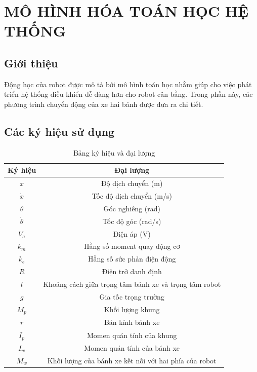 \chapter{MÔ HÌNH HÓA TOÁN HỌC HỆ THỐNG}
    \section{Giới thiệu}
        \hspace*{0.6cm}Động học của robot được mô tả bởi mô hình toán học nhằm giúp cho việc phát triển hệ thống điều khiển dễ dàng hơn cho robot cân bằng. Trong phần này, các phương trình chuyển động của xe hai bánh được đưa ra chi tiết.
    \section{Các ký hiệu sử dụng}
        \begin{table}[H]
            \centering
            \begin{tabular}{|c|c|}
                \hline
                \textbf{Ký hiệu} & \textbf{Đại lượng} \\ \hline
                $x$ & Độ dịch chuyển (m) \\ \hline
                $\dot{x}$ & Tốc độ dịch chuyển (m/s) \\ \hline
                $\theta$ & Góc nghiêng (rad) \\ \hline
                $\dot{\theta}$ & Tốc độ góc (rad/s) \\ \hline
                $V_a$ & Điện áp (V) \\ \hline
                $k_m$ & Hằng số moment quay động cơ \\ \hline
                $k_e$ & Hằng số sức phản điện động \\ \hline
                $R$ & Điện trở danh định \\ \hline
                $l$ & Khoảng cách giữa trọng tâm bánh xe và trọng tâm robot \\ \hline
                $g$ & Gia tốc trọng trường \\ \hline
                $M_p$ & Khối lượng khung \\ \hline
                $r$ & Bán kính bánh xe \\ \hline
                $I_p$ & Momen quán tính của khung \\ \hline
                $I_w$ & Momen quán tính của bánh xe \\ \hline
                $M_w$ & Khối lượng của bánh xe kết nối với hai phía của robot \\ \hline
            \end{tabular}
            \caption{Bảng ký hiệu và đại lượng}
        \end{table}
